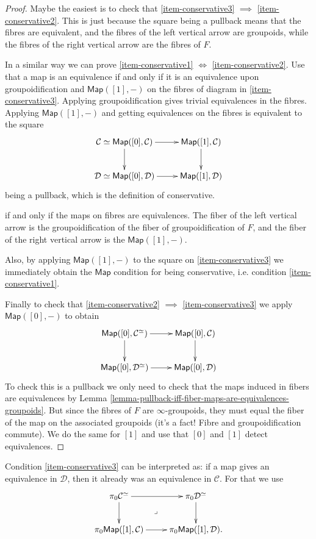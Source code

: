\begin{proof}
Maybe the easiest is to check that 
\ref{item-conservative3} $\implies$ \ref{item-conservative2}.
This is just because the square being a pullback
means that the fibres are equivalent,
and the fibres of the left vertical arrow are
groupoids, while the fibres of the right vertical
arrow are the fibres of $F$.

In a similar way we can prove
\ref{item-conservative1} $\iff$ \ref{item-conservative2}.
Use that a map is an equivalence if and only if it is 
an equivalence upon groupoidification and $\mathsf{Map}([1],-)$ 
on the fibres of diagram in \ref{item-conservative3}.
Applying groupoidification gives
trivial equivalences in the fibres.
Applying $\mathsf{Map}([1],-)$ and getting
equivalences on the fibres is equivalent to
the square
$$
\xymatrix{
\mathcal{C}\simeq\mathsf{Map}([0],\mathcal{C})
\ar[r]\ar[d]&
\mathsf{Map}([1],\mathcal{C})\ar[d]\\
\mathcal{D}\simeq \mathsf{Map}([0],\mathcal{D})\ar[r]&
\mathsf{Map}([1],\mathcal{D})
}
$$
being a pullback, which is the definition of conservative.

if and only if the maps on fibres
are equivalences. The fiber of the left vertical arrow
is the groupoidification of the fiber of groupoidification of $F$,
and the fiber of the right vertical arrow
is the $\mathsf{Map}([1],-)$.

Also, by applying $\mathsf{Map}([1],-)$ to
the square on \ref{item-conservative3}
we immediately obtain the $\mathsf{Map}$ condition
for being conservative, i.e. condition \ref{item-conservative1}.

Finally to check that
\ref{item-conservative2} $\implies$ \ref{item-conservative3} 
we apply $\mathsf{Map}([0],-)$ to obtain
$$
\xymatrix{
\mathsf{Map}([0],\mathcal{C}^\simeq)\ar[r]\ar[d]
&\mathsf{Map}([0],\mathcal{C})\ar[d]\\
\mathsf{Map}([0],\mathcal{D}^{\simeq})\ar[r]&\mathsf{Map}([0],\mathcal{D})
}
$$
To check this is a pullback we only need to
check that the maps induced in fibers are equivalences
by  Lemma \ref{lemma-pullback-iff-fiber-maps-are-equivalences-groupoids}.
But since the fibres of $F$ are $\infty$-groupoids,
they must equal the fiber of the map on the associated groupoids
(it's a fact! Fibre and groupoidification commute).
We do the same for $[1]$ and use that $[0]$ and $[1]$ detect
equivalences.
\end{proof}

Condition \ref{item-conservative3}
can be interpreted as:
if a map gives an equivalence in $\mathcal{D}$,
then it already was an equivalence in $\mathcal{C}$.
For that we use
$$
\xymatrix{
\pi_0\mathcal{C}^\simeq\ar[r]\ar[d]\ar@{}[dr]|-{\lrcorner}&
\pi_0\mathcal{D}^\simeq\ar[d]\\
\pi_0\mathsf{Map}([1],\mathcal{C})\ar[r]&
\pi_0\mathsf{Map}([1],\mathcal{D}).
}
$$

